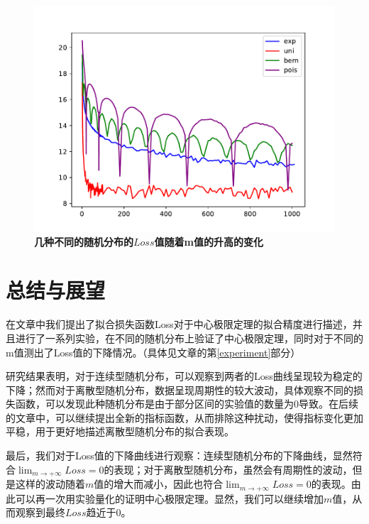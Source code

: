 \documentclass{article}
\begin{document}
\begin{figure}[h]
    \includegraphics[width=\textwidth]{../data/lossLines.pdf}
    \caption{\textbf{几种不同的随机分布的$Loss$值随着m值的升高的变化}}
    \label{res}
\end{figure}

\section{总结与展望}\label{discuss}
在文章中我们提出了拟合损失函数Loss对于中心极限定理的拟合精度进行描述，并且进行了一系列实验，在不同的随机分布上验证了中心极限定理，同时对于不同的m值测出了Loss值的下降情况。（具体见文章的第\ref{experiment}部分）

研究结果表明，对于连续型随机分布，可以观察到两者的Loss曲线呈现较为稳定的下降；然而对于离散型随机分布，数据呈现周期性的较大波动，具体观察不同的损失函数，可以发现此种随机分布是由于部分区间的实验值的数量为0导致。在后续的文章中，可以继续提出全新的指标函数，从而排除这种扰动，使得指标变化更加平稳，用于更好地描述离散型随机分布的拟合表现。

最后，我们对于Loss值的下降曲线进行观察：连续型随机分布的下降曲线，显然符合$\lim_{m\to+\infty}Loss=0$的表现；对于离散型随机分布，虽然会有周期性的波动，但是这样的波动随着$m$值的增大而减小，因此也符合$\lim_{m\to+\infty}Loss=0$的表现。由此可以再一次用实验量化的证明中心极限定理。显然，我们可以继续增加$m$值，从而观察到最终$Loss$趋近于0。


\end{document}
